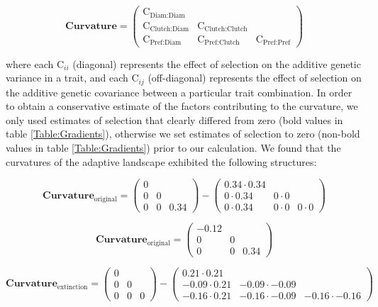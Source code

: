 \documentclass[11pt,]{article}
\begin{document}
\[\textbf{Curvature} = \begin{pmatrix} \text{C}_{\text{Diam:Diam}}&& \\ \text{C}_{\text{Clutch:Diam}} & \text{C}_{\text{Clutch:Clutch}} & \\ \text{C}_{\text{Pref:Diam}} & \text{C}_{\text{Pref:Clutch}} & \text{C}_{\text{Pref:Pref}} \end{pmatrix}\]
\bigskip

where each \(\text{C}_{ii}\) (diagonal) represents the effect of
selection on the additive genetic variance in a trait, and each
\(\text{C}_{ij}\) (off-diagonal) represents the effect of selection on
the additive genetic covariance between a particular trait combination.
In order to obtain a conservative estimate of the factors contributing
to the curvature, we only used estimates of selection that clearly
differed from zero (bold values in table \ref{Table:Gradients}),
otherwise we set estimates of selection to zero (non-bold values in
table \ref{Table:Gradients}) prior to our calculation. We found that the
curvatures of the adaptive landscape exhibited the following structures:

\[\textbf{Curvature}_{\text{original}} = \begin{pmatrix} 
0 &  &  \\  
0 & 0 &  \\  
0 & 0 & 0.34 \end{pmatrix} - \begin{pmatrix} 
0.34\cdot0.34 &  &  \\  
0\cdot0.34 & 0\cdot0 &  \\  
0\cdot0.34 & 0\cdot0 & 0\cdot0 \end{pmatrix}\]

\[\textbf{Curvature}_{\text{original}} = \begin{pmatrix} 
-0.12 &  &  \\  
0 & 0 &  \\  
0 & 0 & 0.34 \end{pmatrix}\]

\[\textbf{Curvature}_{\text{extinction}} = \begin{pmatrix} 
0 &  &  \\  
0 & 0 &  \\  
0 & 0 & 0 \end{pmatrix} - \begin{pmatrix} 
0.21\cdot0.21 &  &  \\  
-0.09\cdot0.21 & -0.09\cdot-0.09 &  \\  
-0.16\cdot0.21 & -0.16\cdot-0.09 & -0.16\cdot-0.16 \end{pmatrix}\]
\end{document}
